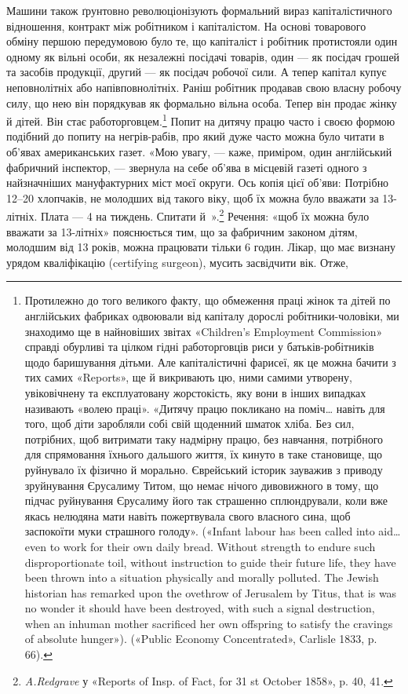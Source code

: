 Машини також ґрунтовно революціонізують формальний вираз
капіталістичного відношення, контракт між робітником і капіталістом.
На основі товарового обміну першою передумовою було
те, що капіталіст і робітник протистояли один одному як вільні
особи, як незалежні посідачі товарів, один — як посідач грошей
та засобів продукції, другий — як посідач робочої сили. А тепер
капітал купує неповнолітніх або напівповнолітніх. Раніш
робітник продавав свою власну робочу силу, що нею він порядкував
як формально вільна особа. Тепер він продає жінку
й дітей. Він стає работорговцем.\footnote{
Протилежно до того великого факту, що обмеження праці жінок
та дітей по англійських фабриках одвоювали від капіталу дорослі робітники-чоловіки,
ми знаходимо ще в найновіших звітах «Children’s Employment
Commission» справді обурливі та цілком гідні работорговців риси
у батьків-робітників щодо баришування дітьми. Але капіталістичні
фарисеї, як це можна бачити з тих самих «Reports», ще й викривають цю,
ними самими утворену, увіковічнену та експлуатовану жорстокість, яку
вони в інших випадках називають «волею праці». «Дитячу працю покликано
на поміч\dots{} навіть для того, щоб діти заробляли собі свій щоденний
шматок хліба. Без сил, потрібних, щоб витримати таку надмірну
працю, без навчання, потрібного для спрямовання їхнього дальшого життя,
їх кинуто в таке становище, що руйнувало їх фізично й морально. Єврейський
історик зауважив з приводу зруйнування Єрусалиму Титом, що
немає нічого дивовижного в тому, що підчас руйнування Єрусалиму його
так страшенно сплюндрували, коли вже якась нелюдяна мати навіть пожертвувала
свого власного сина, щоб заспокоїти муки страшного голоду».
(«Infant labour has been called into aid\dots{} even to work for their own daily
bread. Without strength to endure such disproportionate toil, without
instruction to guide their future life, they have been thrown into a situation
physically and morally polluted. The Jewish historian has remarked upon
the ovethrow of Jerusalem by Titus, that is was no wonder it should have
been destroyed, with such a signal destruction, when an inhuman mother
sacrificed her own offspring to satisfy the cravings of absolute hunger»).
(«Public Economy Concentrated», Carlisle 1833, p. 66).
} Попит на дитячу працю
часто і своєю формою подібний до попиту на негрів-рабів,
про який дуже часто можна було читати в об’явах американських
газет. «Мою увагу, — каже, приміром, один англійський
фабричний інспектор, — звернула на себе об’ява в місцевій
газеті одного з найзначніших мануфактурних міст моєї округи.
Ось копія цієї об’яви: Потрібно 12--20 хлопчаків, не молодших
від такого віку, щоб їх можна було вважати за 13-літніх.
Плата — 4 на тиждень. Спитати й~».\footnote{
 \emph{A.Redgrave} у «Reports of Insp. of Fact, for 31 st October
1858», p. 40, 41.
} Речення:
«щоб їх можна було вважати за 13-літніх» пояснюється тим, що
за фабричним законом дітям, молодшим від 13 років, можна
працювати тільки 6 годин. Лікар, що має визнану урядом кваліфікацію
(certifying surgeon), мусить засвідчити вік. Отже,

\parbreak{}  %
